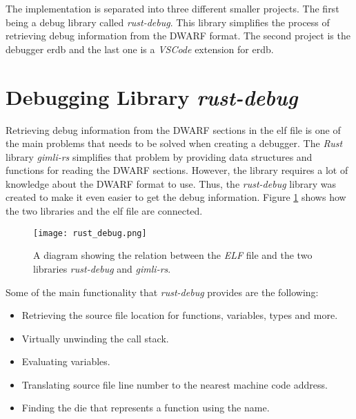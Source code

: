  

The implementation is separated into three different smaller projects.
The first being a debug library called \emph{rust-debug}.
This library simplifies the process of retrieving debug information from the \gls{DWARF} format.
The second project is the debugger \gls{erdb} and the last one is a \emph{VSCode} extension for \gls{erdb}.


\section{Debugging Library \emph{rust-debug}}
\label{section:rust-debug}

Retrieving debug information from the \gls{DWARF} sections in the \gls{elf} file is one of the main problems that needs to be solved when creating a debugger.
The \emph{Rust} library \emph{gimli-rs} simplifies that problem by providing data structures and functions for reading the \gls{DWARF} sections.
However, the library requires a lot of knowledge about the \gls{DWARF} format to use.
Thus, the \emph{rust-debug} library was created to make it even easier to get the debug information.
Figure \ref{fig:rustdebug} shows how the two libraries and the \gls{elf} file are connected.


\begin{figure}[h]
	\centering
	\texttt{[image: rust\_debug.png]}
	\caption{A diagram showing the relation between the \emph{ELF} file and the two libraries \emph{rust-debug} and \emph{gimli-rs}.}
	\label{fig:rustdebug}
\end{figure}


Some of the main functionality that \emph{rust-debug} provides are the following:

\begin{itemize}
  \item Retrieving the source file location for functions, variables, types and more.
  \item Virtually unwinding the call stack.
  \item Evaluating variables.
  \item Translating source file line number to the nearest machine code address.
  \item Finding the \gls{die} that represents a function using the name.
\end{itemize}

